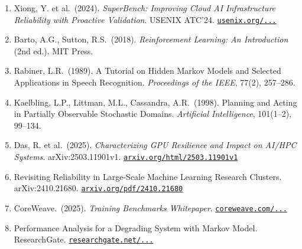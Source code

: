 \documentclass[12pt,a4paper]{article}
\begin{document}
\begin{enumerate}
  \item Xiong, Y. et al.\ (2024).
        \textit{SuperBench: Improving Cloud AI Infrastructure Reliability with Proactive Validation}.
        USENIX ATC'24.
        \href{https://www.usenix.org/system/files/atc24-xiong.pdf}{\texttt{usenix.org/...}}

  \item Barto, A.G., Sutton, R.S.\ (2018).
        \textit{Reinforcement Learning: An Introduction} (2nd ed.).
        MIT Press.

  \item Rabiner, L.R.\ (1989).
        A Tutorial on Hidden Markov Models and Selected Applications in Speech Recognition.
        \textit{Proceedings of the IEEE}, 77(2), 257--286.

  \item Kaelbling, L.P., Littman, M.L., Cassandra, A.R.\ (1998).
        Planning and Acting in Partially Observable Stochastic Domains.
        \textit{Artificial Intelligence}, 101(1--2), 99--134.

  \item Das, R. et al.\ (2025).
        \textit{Characterizing GPU Resilience and Impact on AI/HPC Systems}.
        arXiv:2503.11901v1.
        \href{https://arxiv.org/html/2503.11901v1}{\texttt{arxiv.org/html/2503.11901v1}}

  \item Revisiting Reliability in Large-Scale Machine Learning Research Clusters.
        arXiv:2410.21680.
        \href{https://arxiv.org/pdf/2410.21680}{\texttt{arxiv.org/pdf/2410.21680}}

  \item CoreWeave.\ (2025).
        \textit{Training Benchmarks Whitepaper}.
        \href{https://cdn.prod.website-files.com/62bc66d283fd9c34ffec780a/689fa33a0e99f19c11c8ecbe_CoreWeave\%20Training\%20Benchmarks\%20Whitepaper\%20August\%202025.pdf}{\texttt{coreweave.com/...}}

  \item Performance Analysis for a Degrading System with Markov Model.
        ResearchGate.
        \href{https://www.researchgate.net/publication/363336255}{\texttt{researchgate.net/...}}
\end{enumerate}
\end{document}
